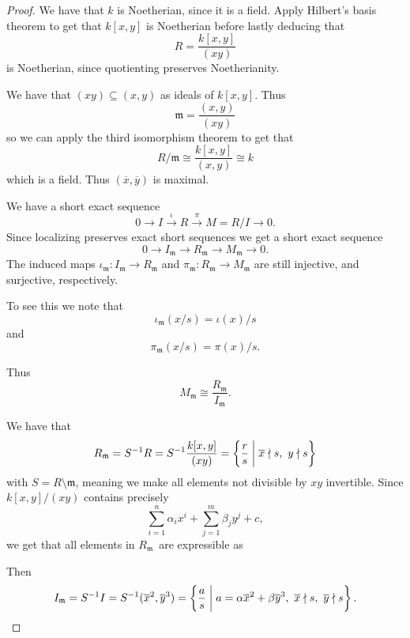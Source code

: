 \documentclass[11pt]{article}
\begin{document}
\begin{proof}
    We have that $k$ is Noetherian, since it is 
    a field. Apply Hilbert's basis theorem to 
    get that $k[x,y]$ is Noetherian before 
    lastly deducing that 
    \[
        R = \frac{k[x,y]}{(xy)}
    \]
    is Noetherian, since quotienting 
    preserves Noetherianity. 

    We have that 
    $(xy) \subseteq (x,y)$ as ideals of $k[x,y]$. 
    Thus 
    \[
        \mathfrak m = \frac{(x, y)}{(xy)} 
    \]
    so we can apply the third isomorphism theorem to 
    get that 
    \[
        R/\mathfrak m \cong \frac{k[x,y]}{(x,y)} 
        \cong k 
    \]
    which is a field. Thus $(\overline x, \overline y)$ 
    is maximal. 

    We have a short exact sequence 
    \[
        0 \to I \overset\iota\to R \overset\pi\to M = R/I \to 0. 
    \]
    Since localizing preserves exact short sequences we 
    get a short exact sequence 
    \[
        0 \to I_{\mathfrak m} \to R_{\mathfrak m} 
        \to M_{\mathfrak m} \to 0.  
    \]
    The induced maps $\iota_{\mathfrak m} : I_{\mathfrak m} 
    \to R_{\mathfrak m}$ and $\pi_{\mathfrak m} : 
    R_{\mathfrak m} \to M_{\mathfrak m}$ are still 
    injective, and surjective, respectively. 

    To see this we note that 
    \[
        \iota_{\mathfrak m}(x/s) = \iota(x)/s 
    \]
    and 
    \[
        \pi_{\mathfrak m}(x/s) = \pi(x)/s.
    \]

    Thus 
    \[
        M_{\mathfrak m} \cong 
        \frac{R_{\mathfrak m}}{I_{\mathfrak m}}. 
    \]

    We have that 
    \[
        R_{\mathfrak m} = S^{-1}R = S^{-1}\frac{k[x,y]}{(xy)} 
        = \left\{\frac{r}{s} \biggm| \overline x \nmid 
        s, \ y \nmid s\right\}
    \]
    with $S = R \setminus \mathfrak m$, 
    meaning we make all elements not divisible 
    by $xy$ invertible. 
    Since $k[x,y]/(xy)$ contains precisely 
    \[
        \sum_{i=1}^n \alpha_i x^i + \sum_{j=1}^m \beta_j y^j + c, 
    \]
    we get that 
    all elements in $R_{\mathfrak m}$ are expressible as 

    Then 
    \[
        I_{\mathfrak m} 
        = S^{-1}I = S^{-1}(\overline x^2, \overline y^3) 
        = \left\{ \frac{a}{s} \biggm| a = \alpha \overline x^2 
        + \beta \overline y^3, \ \overline x \nmid 
    s, \ \overline y \nmid s\right\}.
    \]

\end{proof}
\end{document}
